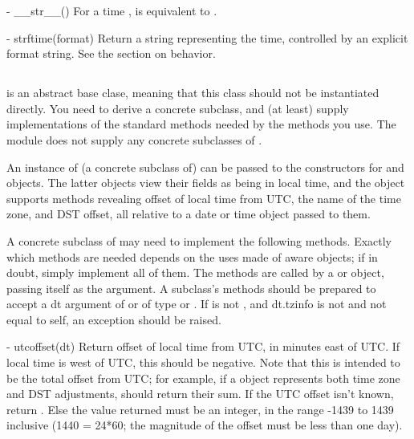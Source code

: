   - __str__()
    For a time ,  is equivalent to
    .

  - strftime(format)
    Return a string representing the time, controlled by an explicit
    format string.  See the section on  behavior.


\subsection{ \label{datetime-tzinfo}}

 is an abstract base clase, meaning that this class
should not be instantiated directly.  You need to derive a concrete
subclass, and (at least) supply implementations of the standard
 methods needed by the  methods you
use. The  module does not supply any concrete
subclasses of .

An instance of (a concrete subclass of)  can be passed
to the constructors for  and  objects.
The latter objects view their fields as being in local time, and the
 object supports methods revealing offset of local time
from UTC, the name of the time zone, and DST offset, all relative to a
date or time object passed to them.

A concrete subclass of  may need to implement the
following methods.  Exactly which methods are needed depends on the
uses made of aware  objects; if in doubt, simply
implement all of them.  The methods are called by a 
or  object, passing itself as the argument.  A
 subclass's methods should be prepared to accept a dt
argument of  or of type  or
.  If is not , and dt.tzinfo is not
 and not equal to self, an exception should be raised.

  - utcoffset(dt)
    Return offset of local time from UTC, in minutes east of UTC.  If
    local time is west of UTC, this should be negative.  Note that this
    is intended to be the total offset from UTC; for example, if a
     object represents both time zone and DST adjustments,
     should return their sum.  If the UTC offset
    isn't known, return .  Else the value returned must be
    an integer, in the range -1439 to 1439 inclusive (1440 = 24*60;
    the magnitude of the offset must be less than one day).

